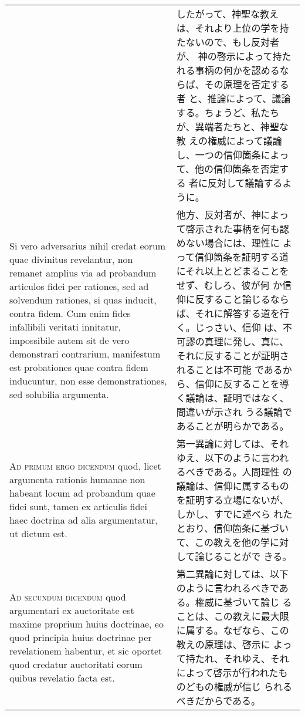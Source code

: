 \documentclass[10pt]{jsarticle}
\begin{document}
\begin{longtable}{p{21em}p{21em}}
&

したがって、神聖な教えは、それより上位の学を持たないので、もし反対者が、
神の啓示によって持たれる事柄の何かを認めるならば、その原理を否定する者
と、推論によって、議論する。ちょうど、私たちが、異端者たちと、神聖な教
えの権威によって議論し、一つの信仰箇条によって、他の信仰箇条を否定する
者に反対して議論するように。


\\


Si vero adversarius nihil credat eorum quae divinitus revelantur, non
remanet amplius via ad probandum articulos fidei per rationes, sed ad
solvendum rationes, si quas inducit, contra fidem. Cum enim fides
infallibili veritati innitatur, impossibile autem sit de vero
demonstrari contrarium, manifestum est probationes quae contra fidem
inducuntur, non esse demonstrationes, sed solubilia argumenta.


&

他方、反対者が、神によって啓示された事柄を何も認めない場合には、理性に
よって信仰箇条を証明する道にそれ以上とどまることをせず、むしろ、彼が何
か信仰に反すること論じるならば、それに解答する道を行く。じっさい、信仰
は、不可謬の真理に発し、真に、それに反することが証明されることは不可能
であるから、信仰に反することを導く議論は、証明ではなく、間違いが示され
うる議論であることが明らかである。


\\


{\scshape Ad primum ergo dicendum} quod, licet argumenta rationis
humanae non habeant locum ad probandum quae fidei sunt, tamen ex
articulis fidei haec doctrina ad alia argumentatur, ut dictum est.


&

第一異論に対しては、それゆえ、以下のように言われるべきである。人間理性
の議論は、信仰に属するものを証明する立場にないが、しかし、すでに述べら
れたとおり、信仰箇条に基づいて、この教えを他の学に対して論じることがで
きる。




\\


{\scshape Ad secundum dicendum} quod argumentari ex auctoritate est
maxime proprium huius doctrinae, eo quod principia huius doctrinae per
revelationem habentur, et sic oportet quod credatur auctoritati eorum
quibus revelatio facta est.

&

第二異論に対しては、以下のように言われるべきである。権威に基づいて論じ
ることは、この教えに最大限に属する。なぜなら、この教えの原理は、啓示に
よって持たれ、それゆえ、それによって啓示が行われたものどもの権威が信じ
られるべきだからである。


\end{longtable}
\end{document}
